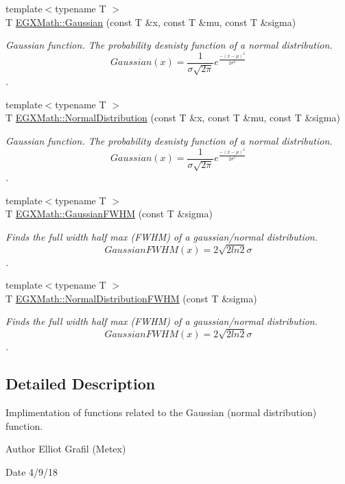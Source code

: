\begin{DoxyCompactItemize}
\item 
{\footnotesize template$<$typename T $>$ }\\T \mbox{\hyperlink{group___e_g_x_math-_functions-_gaussian_ga647b46315081e299edc16a1c7f4e4032}{E\+G\+X\+Math\+::\+Gaussian}} (const T \&x, const T \&mu, const T \&sigma)
\begin{DoxyCompactList}\small\item\em Gaussian function. The probability desnisty function of a normal distribution. \[ Gaussian(x)=\frac{1}{\sigma \sqrt{2\pi}}e^{\frac{-(x-\mu)^2}{2\sigma^2}} \]. \end{DoxyCompactList}\item 
{\footnotesize template$<$typename T $>$ }\\T \mbox{\hyperlink{group___e_g_x_math-_functions-_gaussian_ga3747a7d047293d0e5310ba112bece627}{E\+G\+X\+Math\+::\+Normal\+Distribution}} (const T \&x, const T \&mu, const T \&sigma)
\begin{DoxyCompactList}\small\item\em Gaussian function. The probability desnisty function of a normal distribution. \[Gaussian(x)=\frac{1}{\sigma \sqrt{2\pi}}e^{\frac{-(x-\mu)^2}{2\sigma^2}}\]. \end{DoxyCompactList}\item 
{\footnotesize template$<$typename T $>$ }\\T \mbox{\hyperlink{group___e_g_x_math-_functions-_gaussian_ga0b8be7b82cb82e871a2613e6a7180431}{E\+G\+X\+Math\+::\+Gaussian\+F\+W\+HM}} (const T \&sigma)
\begin{DoxyCompactList}\small\item\em Finds the full width half max (F\+W\+HM) of a gaussian/normal distribution. \[GaussianFWHM(x)=2\sqrt{2 ln 2} \sigma \]. \end{DoxyCompactList}\item 
{\footnotesize template$<$typename T $>$ }\\T \mbox{\hyperlink{group___e_g_x_math-_functions-_gaussian_gac537b8c525932979b28101cf432bcc0f}{E\+G\+X\+Math\+::\+Normal\+Distribution\+F\+W\+HM}} (const T \&sigma)
\begin{DoxyCompactList}\small\item\em Finds the full width half max (F\+W\+HM) of a gaussian/normal distribution. \[GaussianFWHM(x)=2\sqrt{2 ln 2} \sigma \]. \end{DoxyCompactList}\end{DoxyCompactItemize}


\subsection{Detailed Description}
Implimentation of functions related to the Gaussian (normal distribution) function. 

\begin{DoxyAuthor}{Author}
Elliot Grafil (Metex) 
\end{DoxyAuthor}
\begin{DoxyDate}{Date}
4/9/18 
\end{DoxyDate}
